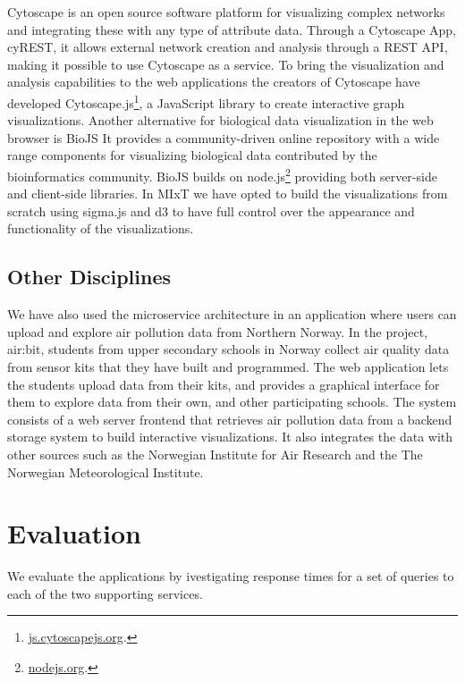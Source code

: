 Cytoscape is an open source software platform for visualizing complex networks
and integrating these with any type of attribute
data.\cite{shannon2003cytoscape} Through a Cytoscape App, cyREST, it allows
external network creation and analysis through a REST API\cite{ono2015cyrest},
making it possible to use Cytoscape as a service.  To bring the visualization
and analysis capabilities to the web applications the creators of Cytoscape have
developed Cytoscape.js\footnote{\url{js.cytoscapejs.org}.}, a JavaScript library
to create interactive graph visualizations.  Another alternative for biological
data visualization in the web browser is BioJS It provides a community-driven
online repository with a wide range components for visualizing biological data
contributed by the bioinformatics community.\cite{gomez2013biojs} BioJS builds
on node.js\footnote{\url{nodejs.org}.} providing both server-side and
client-side libraries. In MIxT we have opted to build the visualizations from
scratch using sigma.js and d3 to have full control over the appearance and
functionality of the visualizations. 

\subsection{Other Disciplines}
We have also used the microservice architecture in an application where users
can upload and explore air pollution data from Northern
Norway.\cite{fjukstad2018low} In the project, air:bit, students from upper
secondary schools in Norway collect air quality data from sensor kits that they
have built and programmed. The web application lets the students upload data
from their kits, and provides a graphical interface for them to explore data
from their own, and other participating schools. The system consists of a web
server frontend that retrieves air pollution data from a backend storage system
to build interactive visualizations. It also integrates the data with other
sources such as the Norwegian Institute for Air Research and the The Norwegian
Meteorological Institute. 

\section{Evaluation} 
We evaluate the applications by ivestigating response times for a set of queries
to each of the two supporting services. 

